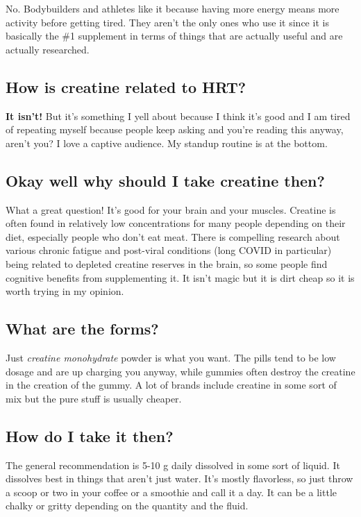 \documentclass{article}
\begin{document}
No. Bodybuilders and athletes like it because having more energy means more activity before getting tired. They aren’t the only ones who use it since it is basically the \#1 supplement in terms of things that are actually useful and are actually researched.

\subsection{How is creatine related to HRT?}

\textbf{It isn’t!} But it’s something I yell about because I think it’s good and I am tired of repeating myself because people keep asking and you’re reading this anyway, aren’t you? I love a captive audience. My standup routine is at the bottom.

\subsection{Okay well why should I take creatine then?}

What a great question! It’s good for your brain and your muscles. Creatine is often found in relatively low concentrations for many people depending on their diet, especially people who don’t eat meat. There is compelling research about various chronic fatigue and post-viral conditions (long COVID in particular) being related to depleted creatine reserves in the brain, so some people find cognitive benefits from supplementing it. It isn’t magic but it is dirt cheap so it is worth trying in my opinion.

\subsection{What are the forms?}

Just \textit{creatine monohydrate} powder is what you want. The pills tend to be low dosage and are up charging you anyway, while gummies often destroy the creatine in the creation of the gummy. A lot of brands include creatine in some sort of mix but the pure stuff is usually cheaper.

\subsection{How do I take it then?}

The general recommendation is 5-10 g daily dissolved in some sort of liquid. It dissolves best in things that aren’t just water. It’s mostly flavorless, so just throw a scoop or two in your coffee or a smoothie and call it a day. It can be a little chalky or gritty depending on the quantity and the fluid.
\end{document}
